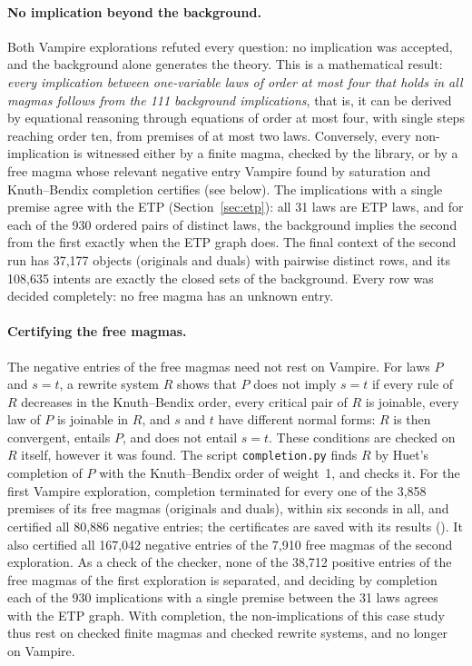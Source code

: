 \documentclass[11pt,a4paper]{article}
\theoremstyle{definition}
\theoremstyle{remark}
\newcommand{\code}[1]{\texttt{#1}}
\begin{document}
\paragraph{No implication beyond the background.}
Both Vampire explorations refuted every question: no implication was accepted, and the background alone generates the theory. This is a mathematical result: \emph{every implication between one-variable laws of order at most four that holds in all magmas follows from the 111 background implications}, that is, it can be derived by equational reasoning through equations of order at most four, with single steps reaching order ten, from premises of at most two laws. Conversely, every non-implication is witnessed either by a finite magma, checked by the library, or by a free magma whose relevant negative entry Vampire found by saturation and Knuth--Bendix completion certifies (see below). The implications with a single premise agree with the ETP (Section~\ref{sec:etp}): all 31 laws are ETP laws, and for each of the 930 ordered pairs of distinct laws, the background implies the second from the first exactly when the ETP graph does. The final context of the second run has 37,177 objects (originals and duals) with pairwise distinct rows, and its 108,635 intents are exactly the closed sets of the background. Every row was decided completely: no free magma has an unknown entry.

\paragraph{Certifying the free magmas.}
The negative entries of the free magmas need not rest on Vampire. For laws $P$ and $s = t$, a rewrite system $R$ shows that $P$ does not imply $s = t$ if every rule of $R$ decreases in the Knuth--Bendix order, every critical pair of $R$ is joinable, every law of $P$ is joinable in $R$, and $s$ and $t$ have different normal forms: $R$ is then convergent, entails $P$, and does not entail $s = t$. These conditions are checked on $R$ itself, however it was found. The script \code{completion.py} finds $R$ by Huet's completion of $P$ with the Knuth--Bendix order of weight~1, and checks it. For the first Vampire exploration, completion terminated for every one of the 3,858 premises of its free magmas (originals and duals), within six seconds in all, and certified all 80,886 negative entries; the certificates are saved with its results (). It also certified all 167,042 negative entries of the 7,910 free magmas of the second exploration. As a check of the checker, none of the 38,712 positive entries of the free magmas of the first exploration is separated, and deciding by completion each of the 930 implications with a single premise between the 31 laws agrees with the ETP graph. With completion, the non-implications of this case study thus rest on checked finite magmas and checked rewrite systems, and no longer on Vampire.
\end{document}
